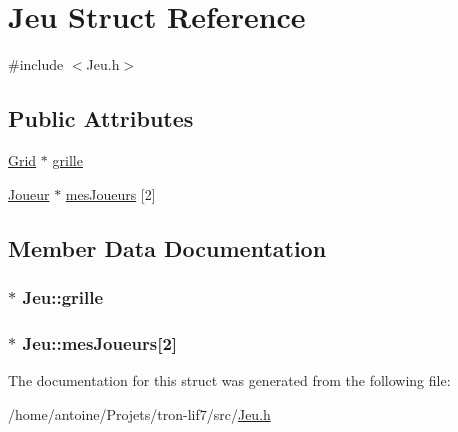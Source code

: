 \hypertarget{structJeu}{\section{Jeu Struct Reference}
\label{structJeu}
}


{\ttfamily \#include $<$Jeu.\-h$>$}

\subsection*{Public Attributes}
\begin{DoxyCompactItemize}
\item 
\hyperlink{structGrid}{Grid} $\ast$ \hyperlink{structJeu_a7afef4a7fcc6dd764a451abc2e0aac59}{grille}
\item 
\hyperlink{structJoueur}{Joueur} $\ast$ \hyperlink{structJeu_ab928438565ce5be8f5370386fadd0ef0}{mes\-Joueurs} \mbox{[}2\mbox{]}
\end{DoxyCompactItemize}


\subsection{Member Data Documentation}
\hypertarget{structJeu_a7afef4a7fcc6dd764a451abc2e0aac59}{
\subsubsection[{grille}]{$\ast$ Jeu\-::grille}}\label{structJeu_a7afef4a7fcc6dd764a451abc2e0aac59}
\hypertarget{structJeu_ab928438565ce5be8f5370386fadd0ef0}{
\subsubsection[{mes\-Joueurs}]{$\ast$ Jeu\-::mes\-Joueurs\mbox{[}2\mbox{]}}}\label{structJeu_ab928438565ce5be8f5370386fadd0ef0}


The documentation for this struct was generated from the following file\-:\begin{DoxyCompactItemize}
\item 
/home/antoine/\-Projets/tron-\/lif7/src/\hyperlink{Jeu_8h}{Jeu.\-h}\end{DoxyCompactItemize}
